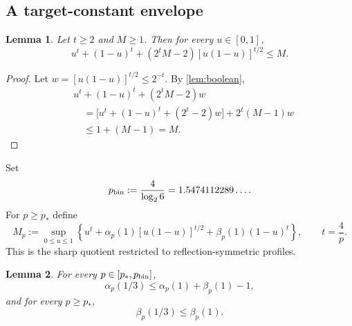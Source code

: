 \documentclass[11pt,reqno]{amsart}
\numberwithin{equation}{section}
\newtheorem{lemma}[lemma]{Lemma}
\theoremstyle{definition}
\theoremstyle{remark}
\begin{document}
\subsection{A target-constant envelope}

\begin{lemma}\label{lem:boolean-target}
Let $t\ge2$ and $M\ge1$.  Then for every $u\in[0,1]$,
\begin{equation}\label{eq:boolean-target}
  u^t+(1-u)^t+(2^tM-2)[u(1-u)]^{t/2}\le M.
\end{equation}
\end{lemma}

\begin{proof}
Let $w=[u(1-u)]^{t/2}\le2^{-t}$.  By \cref{lem:boolean},
\begin{align*}
 &u^t+(1-u)^t+(2^tM-2)w\\
 &\quad=\bigl[u^t+(1-u)^t+(2^t-2)w\bigr]
       +2^t(M-1)w\\
 &\quad\le1+(M-1)=M.
\end{align*}
\end{proof}

Set
\begin{equation}\label{eq:pbin}
  p_{\rm bin}:=\frac4{\log_2 6}=1.5474112289\ldots.
\end{equation}
For $p\ge p_*$ define
\begin{equation}\label{eq:Mp}
  M_p:=\sup_{0\le u\le1}
  \left\{
  u^t+\alpha_p(1)[u(1-u)]^{t/2}
  +\beta_p(1)(1-u)^t
  \right\},
  \qquad t=\frac4p.
\end{equation}
This is the sharp quotient restricted to reflection-symmetric profiles.

\begin{lemma}\label{lem:uniform-overlap}
For every $p\in[p_*,p_{\rm bin}]$,
\begin{equation}\label{eq:uniform-overlap-alpha}
  \alpha_p(1/3)
  \le \alpha_p(1)+\beta_p(1)-1,
\end{equation}
and for every $p\ge p_*$,
\begin{equation}\label{eq:uniform-overlap-beta}
  \beta_p(1/3)\le\beta_p(1).
\end{equation}
\end{lemma}
\end{document}
